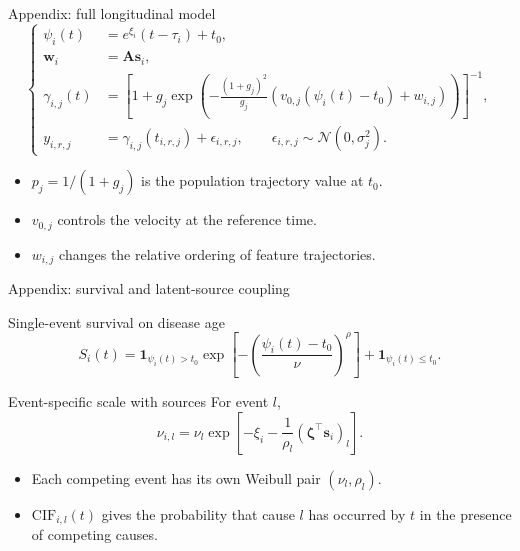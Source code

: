 \documentclass{beamer}
\begin{document}
\begin{frame}{Appendix: full longitudinal model}
  \footnotesize
  \[
  \left\{
  \begin{aligned}
    \psi_i(t) &= e^{\xi_i}(t-\tau_i)+t_0,\\
    \mathbf w_i &= \mathbf A\mathbf s_i,\\
    \gamma_{i,j}(t)
      &=\left[1+g_j\exp\!\left(-\frac{(1+g_j)^2}{g_j}
        \left(v_{0,j}(\psi_i(t)-t_0)+w_{i,j}\right)\right)\right]^{-1},\\
    y_{i,r,j} &= \gamma_{i,j}(t_{i,r,j})+\epsilon_{i,r,j},
      \qquad \epsilon_{i,r,j}\sim\mathcal N(0,\sigma_j^2).
  \end{aligned}
  \right.
  \]

  \vspace{0.8em}
  \begin{itemize}
    \item $p_j=1/(1+g_j)$ is the population trajectory value at $t_0$.
    \item $v_{0,j}$ controls the velocity at the reference time.
    \item $w_{i,j}$ changes the relative ordering of feature trajectories.
  \end{itemize}
\end{frame}

\begin{frame}{Appendix: survival and latent-source coupling}
  \footnotesize
  \begin{block}{Single-event survival on disease age}
    \[
      S_i(t)=\mathbf 1_{\psi_i(t)>t_0}
      \exp\!\left[-\left(\frac{\psi_i(t)-t_0}{\nu}\right)^\rho\right]
      +\mathbf 1_{\psi_i(t)\le t_0}.
    \]
  \end{block}

  \begin{block}{Event-specific scale with sources}
    For event $l$,
    \[
      \nu_{i,l}=\nu_l\exp\!\left[-\xi_i-
      \frac{1}{\rho_l}(\boldsymbol\zeta^\top\mathbf s_i)_l\right].
    \]
  \end{block}

  \begin{itemize}
    \item Each competing event has its own Weibull pair $(\nu_l,\rho_l)$.
    \item $\mathrm{CIF}_{i,l}(t)$ gives the probability that cause $l$ has occurred by $t$ in the presence of competing causes.
  \end{itemize}
\end{frame}
\end{document}
